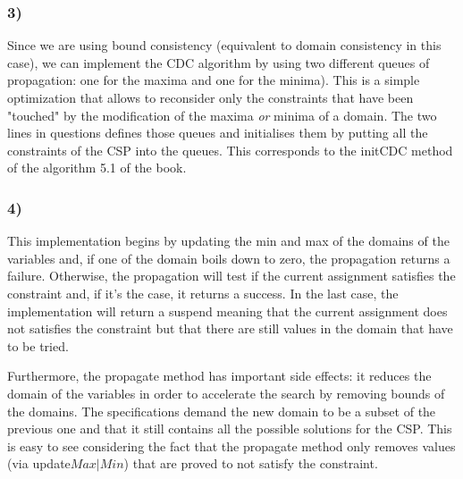 \documentclass[a4paper ,12pt,french]{article}
\begin{document}
\subsubsection{3)}
Since we are using bound consistency (equivalent to domain consistency in this case), we can implement the CDC algorithm by using two different queues of propagation: one for the maxima and one for the minima). This is a simple optimization that allows to reconsider only the constraints that have been "touched" by the modification of the maxima \textit{or} minima of a domain. The two lines in questions defines those queues and initialises them by putting all the constraints of the CSP into the queues. This corresponds to the initCDC method of the algorithm 5.1 of the book.
\subsubsection{4)}
This implementation begins by updating the min and max of the domains of the variables and, if one of the domain boils down to zero, the propagation returns a failure. Otherwise, the propagation will test if the current assignment satisfies the constraint and, if it's the case, it returns a success. 
In the last case, the implementation will return a suspend meaning that the current assignment does not satisfies the constraint but that there are still values in the domain that have to be tried. 

Furthermore, the propagate method has important side effects: it reduces the domain of the variables in order to accelerate the search by removing bounds of the domains. The specifications demand the new domain to be a subset of the previous one and that it still contains all the possible solutions for the CSP. This is easy to see considering the fact that the propagate method only removes values (via update$Max\vert Min$) that are proved to not satisfy the constraint.
\end{document}
